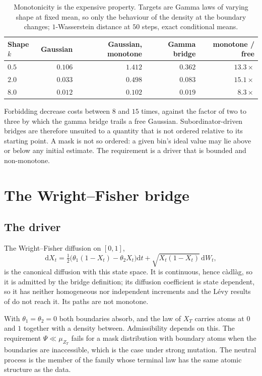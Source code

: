 \documentclass[11pt,a4paper]{article}
\begin{document}
\begin{table}[h]
\centering\small
\caption{Monotonicity is the expensive property. Targets are Gamma laws of
varying shape at fixed mean, so only the behaviour of the density at the
boundary changes; $1$-Wasserstein distance at $50$ steps, exact conditional
means.}
\label{tab:mono}
\begin{tabular}{lrrrr}
\toprule
Shape $k$ & Gaussian & Gaussian, monotone & Gamma bridge & monotone / free \\
\midrule
$0.5$ & $0.106$ & $1.412$ & $0.362$ & $13.3\times$ \\
$2.0$ & $0.033$ & $0.498$ & $0.083$ & $15.1\times$ \\
$8.0$ & $0.012$ & $0.102$ & $0.019$ & $8.3\times$ \\
\bottomrule
\end{tabular}
\end{table}

Forbidding decrease costs between $8$ and $15$ times, against the factor of two
to three by which the gamma bridge trails a free Gaussian. Subordinator-driven
bridges are therefore unsuited to a quantity that is not ordered relative to its
starting point. A mask is not so ordered: a given bin's ideal value may lie
above or below any initial estimate. The requirement is a driver that is bounded
and non-monotone.

\section{The Wright--Fisher bridge}
\label{sec:wf}

\subsection{The driver}

The Wright--Fisher diffusion on $[0,1]$,
\begin{equation}
\mathrm{d}X_t=\tfrac12\big(\theta_1(1-X_t)-\theta_2X_t\big)\mathrm{d}t
+\sqrt{X_t(1-X_t)}\,\mathrm{d}W_t,
\end{equation}
is the canonical diffusion with this state space. It is continuous, hence
c\`adl\`ag, so it is admitted by the bridge definition; its diffusion
coefficient is state dependent, so it has neither homogeneous nor independent
increments and the L\'evy results of \cite{companion} do not reach it. Its
paths are not monotone.

With $\theta_1=\theta_2=0$ both boundaries absorb, and the law of $X_T$ carries
atoms at $0$ and $1$ together with a density between. Admissibility depends on this. The requirement $\Psi\ll\mu_{Z_T}$ fails for a
mask distribution with boundary atoms when the boundaries are inaccessible,
which is the case under strong mutation. The neutral process is the member of
the family whose terminal law has the same atomic structure as the data.
\end{document}
